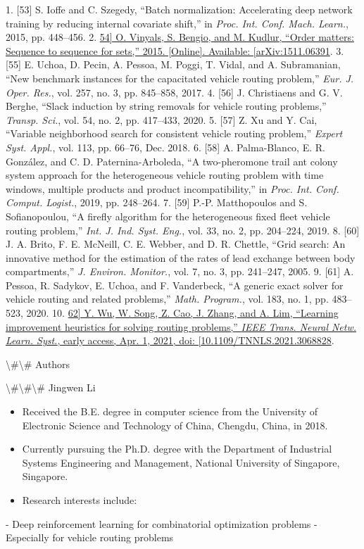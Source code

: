 \documentclass{article}
\begin{document}
	1. [53] S. Ioffe and C. Szegedy, “Batch normalization: Accelerating deep network training by reducing internal covariate shift,” in \textit{Proc. Int. Conf. Mach. Learn.}, 2015, pp. 448–456.
	2. \href{https://arxiv.org/abs/1511.06391}{54] O. Vinyals, S. Bengio, and M. Kudlur, “Order matters: Sequence to sequence for sets,” 2015. [Online]. Available: [arXiv:1511.06391}.
	3. [55] E. Uchoa, D. Pecin, A. Pessoa, M. Poggi, T. Vidal, and A. Subramanian, “New benchmark instances for the capacitated vehicle routing problem,” \textit{Eur. J. Oper. Res.}, vol. 257, no. 3, pp. 845–858, 2017.
	4. [56] J. Christiaens and G. V. Berghe, “Slack induction by string removals for vehicle routing problems,” \textit{Transp. Sci.}, vol. 54, no. 2, pp. 417–433, 2020.
	5. [57] Z. Xu and Y. Cai, “Variable neighborhood search for consistent vehicle routing problem,” \textit{Expert Syst. Appl.}, vol. 113, pp. 66–76, Dec. 2018.
	6. [58] A. Palma-Blanco, E. R. González, and C. D. Paternina-Arboleda, “A two-pheromone trail ant colony system approach for the heterogeneous vehicle routing problem with time windows, multiple products and product incompatibility,” in \textit{Proc. Int. Conf. Comput. Logist.}, 2019, pp. 248–264.
	7. [59] P.-P. Matthopoulos and S. Sofianopoulou, “A firefly algorithm for the heterogeneous fixed fleet vehicle routing problem,” \textit{Int. J. Ind. Syst. Eng.}, vol. 33, no. 2, pp. 204–224, 2019.
	8. [60] J. A. Brito, F. E. McNeill, C. E. Webber, and D. R. Chettle, “Grid search: An innovative method for the estimation of the rates of lead exchange between body compartments,” \textit{J. Environ. Monitor.}, vol. 7, no. 3, pp. 241–247, 2005.
	9. [61] A. Pessoa, R. Sadykov, E. Uchoa, and F. Vanderbeck, “A generic exact solver for vehicle routing and related problems,” \textit{Math. Program.}, vol. 183, no. 1, pp. 483–523, 2020.
	10. \href{https://doi.org/10.1109/TNNLS.2021.3068828}{62] Y. Wu, W. Song, Z. Cao, J. Zhang, and A. Lim, “Learning improvement heuristics for solving routing problems,” \textit{IEEE Trans. Neural Netw. Learn. Syst.}, early access, Apr. 1, 2021, doi: [10.1109/TNNLS.2021.3068828}.
	
	\textbackslash{}#\textbackslash{}# Authors
	
	\textbackslash{}#\textbackslash{}#\textbackslash{}# Jingwen Li
	
	\begin{itemize}
		\item Received the B.E. degree in computer science from the University of Electronic Science and Technology of China, Chengdu, China, in 2018.
		\item Currently pursuing the Ph.D. degree with the Department of Industrial Systems Engineering and Management, National University of Singapore, Singapore.
		\item Research interests include:
	\end{itemize}
	- Deep reinforcement learning for combinatorial optimization problems
	- Especially for vehicle routing problems
	
\end{document}
